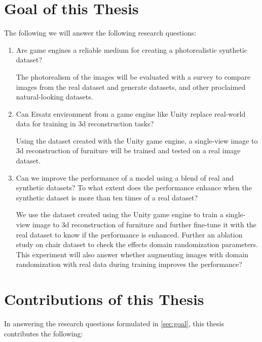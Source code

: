 \section{Goal of this Thesis}\label{sec:goal}

The following we will answer the following research questions:
\begin{enumerate}
    \item Are game engines a reliable medium for creating a photorealistic synthetic dataset?

    The photorealism of the images will be evaluated with a survey to compare images from the real dataset and generate datasets, and other proclaimed natural-looking datasets.

    \item Can Ersatz environment from a game engine like Unity replace real-world data for training in 3d reconstruction tasks?

    Using the dataset created with the Unity game engine, a single-view image to 3d reconstruction of furniture will be trained and tested on a real image dataset.

    \item Can we improve the performance of a model using a blend of real and synthetic datasets?
    To what extent does the performance enhance when the synthetic dataset is more than ten times of a real dataset?

    We use the dataset created using the Unity game engine to train a single-view image to 3d reconstruction of furniture and further fine-tune it with the real dataset to know if the performance is enhanced.
    Further an ablation study on chair dataset to check the effects domain randomization parameters.
    This experiment will also answer whether augmenting images with domain randomization with real data during training improves the performance?

\end{enumerate}

\section{Contributions of this Thesis}\label{sec:contributions}
In answering the research questions formulated in \autoref{sec:goal}, this thesis contributes the following:

